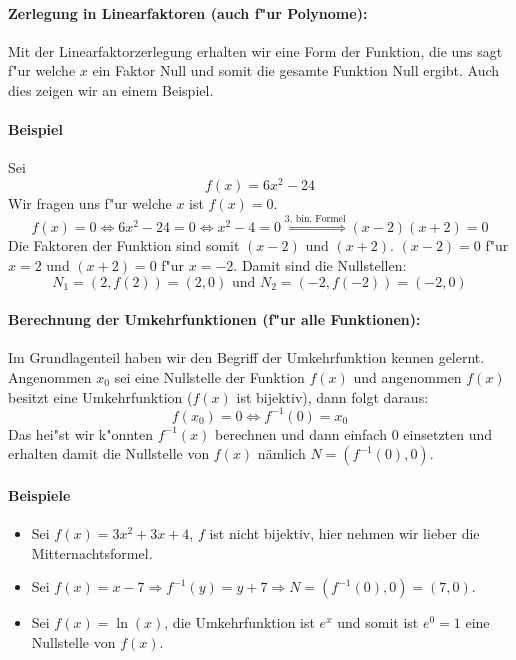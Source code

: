 \paragraph{Zerlegung in Linearfaktoren (auch f"ur Polynome):}

Mit der Linearfaktorzerlegung erhalten wir eine Form der Funktion, die uns sagt f"ur welche $x$ ein Faktor Null und somit die gesamte Funktion Null ergibt. Auch dies zeigen wir an einem Beispiel.

\paragraph{Beispiel}
Sei
\begin{equation*}
f(x) = 6x^2 - 24
\end{equation*}
Wir fragen uns f"ur welche $x$ ist $f(x) = 0$.
\begin{equation*}
f(x) = 0 \iff 6x^2 - 24 = 0 \iff x^2 - 4 = 0 \stackrel{\text{3. bin. Formel}}{\iff} (x-2)(x+2) = 0 
\end{equation*}
Die Faktoren der Funktion sind somit $(x-2)$ und $(x+2)$. $(x-2) = 0$ f"ur $x = 2$ und $(x+2) = 0$ f"ur  $x = -2$. Damit sind die Nullstellen:
\begin{equation*}
N_1 = (2, f(2)) = (2, 0) \text{ und } N_2 = (-2, f(-2)) = (-2, 0)
\end{equation*}

\paragraph{Berechnung der Umkehrfunktionen (f"ur alle Funktionen):}
Im Grundlagenteil haben wir den Begriff der Umkehrfunktion kennen gelernt. Angenommen $x_0$ sei eine Nullstelle der Funktion $f(x)$ und angenommen $f(x)$ besitzt eine Umkehrfunktion ($f(x)$ ist bijektiv), dann folgt daraus:
\begin{equation*}
f(x_0) = 0 \iff f^{-1}(0) = x_0
\end{equation*}
Das hei"st wir k"onnten $f^{-1}(x)$ berechnen und dann einfach $0$ einsetzten und erhalten damit die Nullstelle von $f(x)$ nämlich $N = (f^{-1}(0), 0)$.

\paragraph{Beispiele}
\begin{itemize}
\item Sei $f(x) = 3x^2 + 3x + 4$, $f$ ist nicht bijektiv, hier nehmen wir lieber die Mitternachtsformel.
\item Sei $f(x) = x - 7 \Rightarrow f^{-1}(y) = y + 7 \Rightarrow N = (f^{-1}(0), 0) = (7, 0)$.
\item Sei $f(x) = \ln(x)$, die Umkehrfunktion ist $e^x$ und somit ist $e^0 = 1$ eine Nullstelle von $f(x)$.
\end{itemize}

